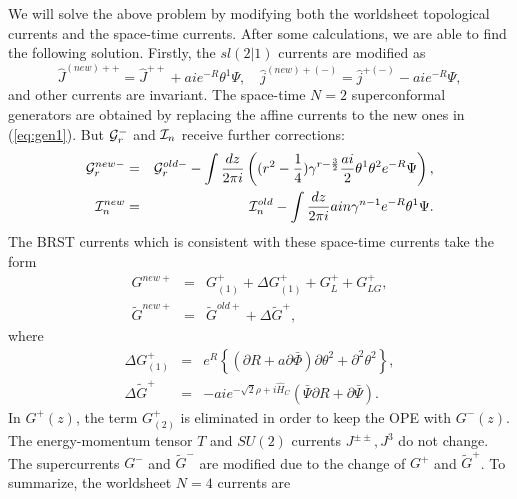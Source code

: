 \documentclass[a4paper,12pt]{article}
\begin{document}
We will solve the above problem by modifying both the worldsheet
topological currents and the space-time currents.
After some calculations, we are able to find the following solution.
Firstly, the $sl(2|1)$ currents
are modified as
\begin{equation}
 \hat{J}^{(new)++}=\hat{J}^{++}+aie^{-R}\theta^{1}\Psi,\quad
 \hat{j}^{(new)+(-)}=\hat{j}^{+(-)} -aie^{-R}\Psi,
\label{eq:gen2}
\end{equation}
and other currents are invariant.
The space-time $N=2$ superconformal generators are obtained by replacing
the affine currents to the new ones in (\ref{eq:gen1}). But
${\cal G}^{-}_{r}$ and ${\cal I}_{n}$
receive further corrections:
\begin{eqnarray}
 {\cal G}^{new -}_{r}&=& {\cal G}^{old -}_{r}
-\int {dz\over 2\pi i}\left((r^2-{1\over4})\gamma^{r-{3\over2}}{ai\over2}
\theta^1\theta^2 e^{-R}\Psi\right),\nonumber\\
{\cal I}^{new}_{n}&=&{\cal I}^{old}_{n}
-\int {dz\over 2\pi i} a i n\gamma^{n-1} e^{-R}\theta^1\Psi.
\label{eq:gen3}
\end{eqnarray}
The BRST currents which is consistent with these space-time currents
take the form
\begin{eqnarray}
G^{new +}&=&G^{+}_{(1)}+\Delta G^{+}_{(1)}+G^{+}_{L}+G^{+}_{LG}, \nonumber\\
\widetilde G^{new +}&=& \widetilde{G}^{old +}+\Delta \widetilde{G}^{+},
\label{eq:brs2}
\end{eqnarray}
where
\begin{eqnarray}
 \Delta G^{+}_{(1)}&=&e^{R}\left\{(\partial R+a\partial\bar{\Phi})
\partial\theta^2+\partial^2\theta^2\right\},  \nonumber\\
 \Delta \widetilde{G}^{+}&=& -a i e^{-\sqrt{2}\rho+i \widehat{H}_{C}}
(\bar{\Psi}\partial R+\partial \bar{\Psi}).
\end{eqnarray}
In $G^{+}(z)$, the term $G^{+}_{(2)}$ is eliminated in order to keep
the OPE with $G^{-}(z)$.
The energy-momentum tensor $T$ and $SU(2)$ currents $J^{\pm\pm},J^{3}$ 
do not change.
The supercurrents $G^{-}$ and $\tilde{G}^{-}$ are modified due to the 
change of $G^{+}$ and $\widetilde{G}^{+}$.
To summarize, the worldsheet $N=4$ currents are
\end{document}

